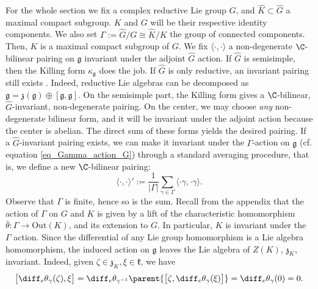 For the whole section we fix a complex reductive Lie group \(\hat{G}\), and \(\hat{K}\subset \hat{G}\) a maximal compact subgroup. \(K\) and \(G\) will be their respective identity components. We also set \(\Gamma:=\hat{G}/G  \cong\hat{K}/K\) the group of connected components. Then, \(K\) is a maximal compact subgroup of \(G\). We fix \(\langle \cdot , \cdot \rangle\) a non-degenerate \(\C\)-bilinear pairing on \(\mathfrak{g}\) invariant under the adjoint \(\hat{G}\) action. If \(\hat{G}\) is semisimple, then the Killing form \(\kappa_{\mathfrak{g}}\) does the job. If \(\hat{G}\) is only reductive, an invariant pairing still exists \parencite{Benito2024}. Indeed, reductive Lie algebras can be decomposed as \(\mathfrak{g}=\mathfrak{z}(\mathfrak{g})\oplus [\mathfrak{g}, \mathfrak{g}]\). On the semisimple part, the Killing form gives a \(\C\)-bilinear, \(\hat{G}\)-invariant, non-degenerate pairing. On the center, we may choose \textit{any} non-degenerate bilinear form, and it will be invariant under the adjoint action because the center is abelian. The direct sum of these forms yields the desired pairing. If a \(\hat{G}\)-invariant pairing exists, we can make it invariant under the \(\Gamma\)-action on \(\mathfrak{g}\) (cf. equation \eqref{eq_Gamma_action_G}) through a standard averaging procedure, that is, we define a new \(\C\)-bilinear pairing:
\[
\langle \cdot, \cdot \rangle':=\frac{1}{|\Gamma|} \sum_{\gamma \in \Gamma} \langle \cdot \gamma, \cdot \gamma \rangle.
\]
Observe that \(\Gamma\) is finite, hence so is the sum. Recall from the appendix that the action of \(\Gamma\) on \(G\) and \(K\) is given by a lift of the characteristic homomorphism \(\bar{\theta}\colon \Gamma \to \mathrm{Out}(K)\), and its extension to \(G\). In particular, \(K\) is invariant under the \(\Gamma\) action. Since the differential of any Lie group homomorphism is a Lie algebra homomorphism, the induced action on \(\mathfrak{g}\) leaves the Lie algebra of \(Z(K)\), \(\mathfrak{z}_K\), invariant. Indeed, given \(\zeta \in \mathfrak{z}_K, \xi \in \mathfrak{k}\), we have
\begin{equation} \label{lie_group_hom_induces_lie_alg_hom}
    \big[\diff_e\theta_{\gamma}(\zeta), \xi \big] = \diff_e \theta_{\gamma^{-1}} \parent{\big[\zeta, \diff_e \theta_\gamma(\xi) \big]} = \diff_e\theta_{\gamma}(0)=0.
\end{equation}

